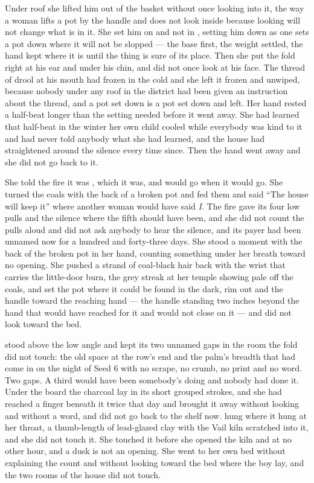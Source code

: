 \scenebreak

Under  roof she lifted him out of the basket without once looking into it, the way a woman lifts a pot by the handle and does not look inside because looking will not change what is in it. She set him on  and not in , setting him down as one sets a pot down where it will not be slopped --- the base first, the weight settled, the hand kept where it is until the thing is sure of its place. Then she put the fold right at his ear and under his chin, and did not once look at his face. The thread of drool at his mouth had frozen in the cold and she left it frozen and unwiped, because nobody under any roof in the district had been given an instruction about the thread, and a pot set down is a pot set down and left. Her hand rested a half-beat longer than the setting needed before it went away. She had learned that half-beat in the winter her own child cooled while everybody was kind to it and had never told anybody what she had learned, and the house had straightened around the silence every time since. Then the hand went away and she did not go back to it.

She told the fire it was , which it was, and would go when it would go. She turned the coals with the back of a broken pot and fed them and said “The house will keep it” where another woman would have said \emph{I}. The fire gave its four low pulls and the silence where the fifth should have been, and she did not count the pulls aloud and did not ask anybody to hear the silence, and its payer had been unnamed now for a hundred and forty-three days. She stood a moment with the back of the broken pot in her hand, counting something under her breath toward no opening. She pushed a strand of coal-black hair back with the wrist that carries the little-door burn, the grey streak at her temple showing pale off the coals, and set the pot where it could be found in the dark, rim out and the handle toward the reaching hand --- the handle standing two inches beyond the hand that would have reached for it and would not close on it --- and did not look toward the bed.

 stood above the low angle and kept its two unnamed gaps in the room the fold did not touch: the old space at the row's end and the palm's breadth that had come in on the night of Seed 6 with no scrape, no crumb, no print and no word. Two gaps. A third would have been somebody's doing and nobody had done it. Under the board the charcoal lay in its short grouped strokes, and she had reached a finger beneath it twice that day and brought it away without looking and without a word, and did not go back to the shelf now.  hung where it hung at her throat, a thumb-length of lead-glazed clay with the Vail kiln scratched into it, and she did not touch it. She touched it before she opened the kiln and at no other hour, and a dusk is not an opening. She went to her own bed without explaining the count and without looking toward the bed where the boy lay, and the two rooms of the house did not touch.

